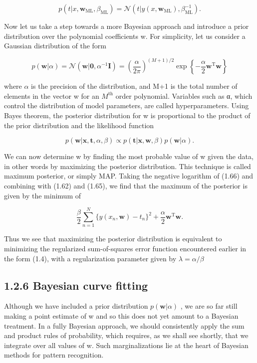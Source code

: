 \documentclass[
  10
]{article}
\begin{document}
\[
p (t | x, \mathbf {w} _ {\mathrm{ML}}, \beta_ {\mathrm{ML}}) = \mathcal {N} \left(t | y (x, \mathbf {w} _ {\mathrm{ML}}), \beta_ {\mathrm{ML}} ^ {- 1}\right).\tag{1.64}
\]

Now let us take a step towards a more Bayesian approach and introduce a
prior distribution over the polynomial coefficients w. For simplicity,
let us consider a Gaussian distribution of the form

\[
p (\mathbf {w} | \alpha) = \mathcal {N} (\mathbf {w} | \mathbf {0}, \alpha^ {- 1} \mathbf {I}) = \left(\frac {\alpha}{2 \pi}\right) ^ {(M + 1) / 2} \exp \left\{- \frac {\alpha}{2} \mathbf {w} ^ {\mathrm{T}} \mathbf {w} \right\}\tag{1.65}
\]

where \(\alpha\) is the precision of the distribution, and M+1 is the
total number of elements in the vector w for an
\(M ^ { \mathrm { t h } }\) order polynomial. Variables such as α, which
control the distribution of model parameters, are called
hyperparameters. Using Bayes theorem, the posterior distribution for w
is proportional to the product of the prior distribution and the
likelihood function

\[
p (\mathbf {w} | \mathbf {x}, \mathbf {t}, \alpha , \beta) \propto p (\mathbf {t} | \mathbf {x}, \mathbf {w}, \beta) p (\mathbf {w} | \alpha).\tag{1.66}
\]

We can now determine w by finding the most probable value of w given the
data, in other words by maximizing the posterior distribution. This
technique is called maximum posterior, or simply MAP. Taking the
negative logarithm of (1.66) and combining with (1.62) and (1.65), we
find that the maximum of the posterior is given by the minimum of

\[
\frac {\beta}{2} \sum_ {n = 1} ^ {N} \{y (x _ {n}, \mathbf {w}) - t _ {n} \} ^ {2} + \frac {\alpha}{2} \mathbf {w} ^ {\mathrm{T}} \mathbf {w}.\tag{1.67}
\]

Thus we see that maximizing the posterior distribution is equivalent to
minimizing the regularized sum-of-squares error function encountered
earlier in the form (1.4), with a regularization parameter given by
\(\lambda = \alpha / \beta\)

\subsection{1.2.6 Bayesian curve fitting}\label{bayesian-curve-fitting}

Although we have included a prior distribution
\(p ( \mathbf { w } | \alpha )\) , we are so far still making a point
estimate of w and so this does not yet amount to a Bayesian treatment.
In a fully Bayesian approach, we should consistently apply the sum and
product rules of probability, which requires, as we shall see shortly,
that we integrate over all values of w. Such marginalizations lie at the
heart of Bayesian methods for pattern recognition.
\end{document}
